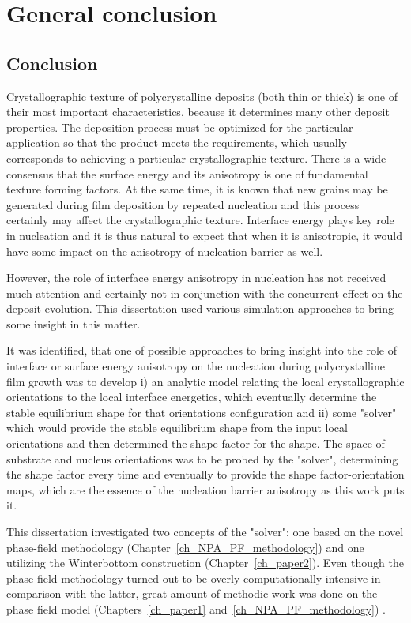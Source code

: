 \chapter{General conclusion} \label{ch_conclusion}
\section{Conclusion}
Crystallographic texture of polycrystalline deposits (both thin or thick) is one of their most important characteristics, because it determines many other deposit properties. The deposition process must be optimized for the particular application so that the product meets the requirements, which usually corresponds to achieving a particular crystallographic texture. There is a wide consensus that the surface energy and its anisotropy is one of fundamental texture forming factors. At the same time, it is known that new grains may be generated during film deposition by repeated nucleation and this process certainly may affect the crystallographic texture. Interface energy plays key role in nucleation and it is thus natural to expect that when it is anisotropic, it would have some impact on the anisotropy of nucleation barrier as well. 

However, the role of interface energy anisotropy in nucleation has not received much attention and certainly not in conjunction with the concurrent effect on the deposit evolution. This dissertation used various simulation approaches to bring some insight in this matter.

It was identified, that one of possible approaches to bring insight into the role of interface or surface energy anisotropy on the nucleation during polycrystalline film growth was to develop i) an analytic model relating the local crystallographic orientations to the local interface energetics, which eventually determine the stable equilibrium shape for that orientations configuration and ii) some "solver" which would provide the stable equilibrium shape from the input local orientations and then determined the shape factor for the shape. The space of substrate and nucleus orientations was to be probed by the "solver", determining the shape factor every time and eventually to provide the shape factor-orientation maps, which are the essence of the nucleation barrier anisotropy as this work puts it.

This dissertation investigated two concepts of the "solver": one based on the novel phase-field methodology (Chapter~\ref{ch_NPA_PF_methodology}) and one utilizing the Winterbottom construction (Chapter~\ref{ch_paper2}). Even though the phase field methodology turned out to be overly computationally intensive in comparison with the latter, great amount of methodic work was done on the phase field model (Chapters~\ref{ch_paper1} and~\ref{ch_NPA_PF_methodology}) . 

